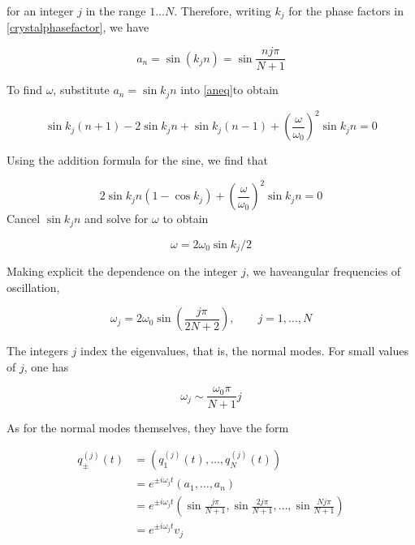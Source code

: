 for an integer $j$ in the range $1\ldots N$.  Therefore, writing $k_j$ for the phase factors in \eqref{crystalphasefactor}, we have

\begin{equation}
a_n = \sin(k_jn) = \sin \frac{nj\pi}{N+1}
\end{equation}


To find $\omega$, substitute $a_n = \sin k_jn$ into \eqref{aneq}to obtain

\begin{equation}
\sin k_j(n+1) - 2\sin k_jn + \sin k_j(n-1)
  + \left(\frac{\omega}{\omega_0}\right)^2  \sin k_jn  = 0
\end{equation}

Using the addition formula for the sine, we find that

\begin{equation}
2\sin k_jn (1 - \cos k_j) 
+ \left(\frac{\omega}{\omega_0}\right)^2 \sin k_jn = 0
\end{equation}
Cancel $\sin k_jn$ and solve for $\omega$ to obtain

\begin{equation}
\omega = 2\omega_0\sin k_j/2
\end{equation}

Making explicit the dependence on the integer $j$, we haveangular frequencies of oscillation,

\begin{equation}
\omega_j = 2\omega_0 \sin\left( \frac{j\pi}{2N+2} \right), 
\qquad j = 1, \ldots, N
\end{equation}

The integers $j$ index the eigenvalues, that is, the normal modes. For small values of $j$, one has

\begin{equation}
\omega_j \sim \frac{\omega_0\pi}{N+1} j
\end{equation}

As for the normal modes themselves, they have the form

\begin{align}
q^{(j)}_\pm(t) &= (q^{(j)}_1(t), \ldots, q^{(j)}_N(t)) \\ 
&= e^{\pm i\omega_j t}(a_1, \ldots, a_n) \\ 
&= e^{\pm i\omega_j t}\left(\sin \frac{j\pi}{N+1}, \sin \frac{2j\pi}{N+1},\ldots, \sin \frac{Nj\pi}{N+1}\right) \\
&=  e^{\pm i\omega_j t} v_j
\end{align}


